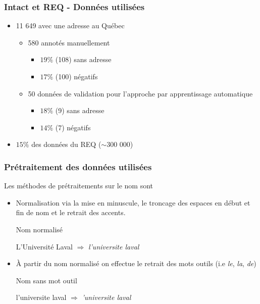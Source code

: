 \documentclass{beamer}
\begin{document}
	\begin{frame}[label=intact-REQ]\frametitle{Intact et REQ - Données utilisées} 
		\begin{itemize}
			\item<1-> 11 649 avec une adresse au Québec
			\begin{itemize}
				\item 580 annotés manuellement
				\begin{itemize}
					\item<2->  $19\%$ (108) sans adresse
					\item<2->  $17\%$ (100) négatifs
				\end{itemize}
				\item<3-> 50 données de validation pour l'approche par apprentissage automatique
				\begin{itemize}
					\item<4-> $18\%$ (9) sans adresse
					\item<4-> $14\%$ (7) négatifs
				\end{itemize}
			\end{itemize}
			\item<5-> $15\%$ des données du REQ ($\sim$300 000)
		\end{itemize}
	\end{frame}
	
	\begin{frame}[label=pretraitement-nom]\frametitle{Prétraitement des données utilisées} 
		Les méthodes de prétraitements sur le nom sont
		\begin{itemize}
			\item<1-> Normalisation via la mise en minuscule, le troncage des espaces en début et fin de nom et le retrait des accents.
			\begin{block}{Nom normalisé}
				\begin{center}
					L'Université Laval $\Rightarrow$ \textit{l'universite laval}
				\end{center}
			\end{block}
			\item<2-> À partir du nom normalisé on effectue le retrait des mots outils (i.e \textit{le}, \textit{la}, \textit{de})
			\begin{block}{Nom sans mot outil}
				\begin{center}
					l'universite laval $\Rightarrow$ \textit{'universite laval}
				\end{center}
			\end{block}
		\end{itemize}
	\end{frame}
	
\end{document}
